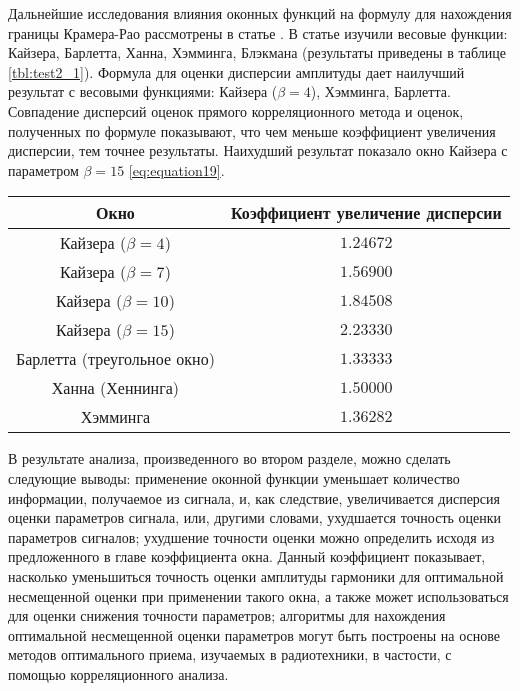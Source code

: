 Дальнейшие исследования влияния оконных функций на формулу для нахождения границы Крамера-Рао рассмотрены в статье \cite{altman2021boundary}.
В статье изучили весовые функции: Кайзера, Барлетта, Ханна, Хэмминга, Блэкмана (результаты приведены в таблице \ref{tbl:test2_1}). Формула для оценки дисперсии амплитуды дает наилучший результат с весовыми функциями: Кайзера ($\beta=4$), Хэмминга, Барлетта. Совпадение дисперсий оценок прямого корреляционного метода и оценок, полученных по формуле показывают, что чем меньше коэффициент увеличения дисперсии, тем точнее результаты. Наихудший результат показало окно Кайзера с параметром $\beta=15$ \ref{eq:equation19}.
\begin{table}[ht]%
	\caption{Зависимость дисперсии оценки амплитуды от дисперсии шума.}
	\label{tbl:test2_1}
	\fontsize{10pt}{10pt}\selectfont
	\begin{longtable*}[c]{|c|c|}  
		\hline
		Окно &
		Коэффициент увеличение дисперсии  \\
		\hline			
		Кайзера ($\beta=4$) & $1.24672$ \\
		\hline
		Кайзера ($\beta=7$) & $1.56900$ \\
		\hline
		Кайзера ($\beta=10$) & $1.84508$ \\
		\hline
		Кайзера ($\beta=15$) & $2.23330$ \\
		\hline
		Барлетта (треугольное окно) & $1.33333$ \\
		\hline
		Ханна (Хеннинга) & $1.50000$ \\
		\hline 
		Хэмминга & $1.36282$ \\
		\hline
	\end{longtable*}%
\end{table}

В результате анализа, произведенного во втором разделе, можно сделать следующие выводы:
применение оконной функции уменьшает количество информации, получаемое из сигнала, и, как следствие, увеличивается дисперсия оценки параметров сигнала, или, другими словами, ухудшается точность оценки параметров сигналов;
ухудшение точности оценки можно определить исходя из предложенного в главе коэффициента окна. Данный коэффициент показывает, насколько уменьшиться точность оценки амплитуды гармоники для оптимальной несмещенной оценки при применении такого окна, а также может использоваться для оценки снижения точности параметров;
алгоритмы для нахождения оптимальной несмещенной оценки параметров могут быть построены на основе методов оптимального приема, изучаемых в радиотехники, в частости, с помощью корреляционного анализа.

